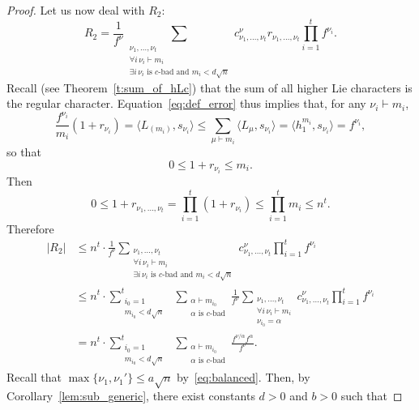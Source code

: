 \documentclass[12pt]%
{amsart}
\newcommand{\al}{{\alpha}}
\theoremstyle{plain}
\theoremstyle{definition}
\theoremstyle{remark}
\begin{document}
\begin{proof}
Let us now deal with $R_2$:
\[
    R_2 
    = \frac{1}{f^\nu} \sum_{\substack{\nu_1,\ldots,\nu_t \\ \forall i\, \nu_i \vdash m_i \\
    \exists i\, \nu_i \text{ is $c$-bad and } m_i < d \sqrt n}} c^\nu_{\nu_1,\ldots,\nu_t} r_{\nu_1, \dots, \nu_t} \prod_{i=1}^t f^{\nu_i} .
\]
Recall (see Theorem~\ref{t:sum_of_hLc})
that the sum of all higher Lie characters is the regular character.
Equation~\eqref{eq:def_error} thus implies that, for any $\nu_i \vdash m_i$, 
 \[
    \frac{f^{\nu_i}}{m_i} (1+r_{\nu_i}) 
    = \langle L_{(m_i)}, s_{\nu_i} \rangle 
    \le \sum_{\mu \vdash m_i} \langle L_\mu, s_{\nu_i} \rangle
    = \langle h_1^{m_i}, s_{\nu_i} \rangle
    = f^{\nu_i},
\]
so that
\[
    0 \le 1 + r_{\nu_i} \le m_i .
\]
Then
\[
    0
    \le 1+ r_{\nu_1, \ldots, \nu_t} 
    = \prod_{i=1}^{t} \left( 1+r_{\nu_i} \right)
    \le \prod_{i=1}^{t} m_i
    \le n^{t}.
\]
Therefore
\begin{align*}
    |R_2| 
    &\le %
    n^{t} \cdot
    \frac{1}{f^\nu} \sum_{\substack{\nu_1,\ldots,\nu_t \\ \forall i\, \nu_i \vdash m_i \\
    \exists i\, \nu_i \text{ is $c$-bad and } m_i < d \sqrt n}} c^\nu_{\nu_1,\ldots,\nu_t} \prod_{i=1}^t f^{\nu_i} \\
    &\le n^{t} \cdot
    \sum_{\substack{i_0 = 1 \\ m_{i_0} < d \sqrt n}}^{t} \,\,\sum_{\substack{\al \vdash m_{i_0} \\ \al \text{ is $c$-bad}}}
    \frac{1}{f^\nu} \sum_{\substack{\nu_1,\ldots,\nu_t \\ \forall i\, \nu_i \vdash m_i \\
    \nu_{i_0} = \al}} c^\nu_{\nu_1,\ldots,\nu_t} \prod_{i=1}^t f^{\nu_i} \\
    &= n^{t} \cdot
    \sum_{\substack{i_0 = 1 \\ m_{i_0} < d \sqrt n}}^{t} \,\,\sum_{\substack{\al \vdash m_{i_0} \\ \al \text{ is $c$-bad}}}
    \frac{f^{\nu/\al} f^\al}{f^\nu} .
\end{align*}
Recall that $\max\{\nu_1,\nu_1'\}\le a\sqrt n$ by~\eqref{eq:balanced}. Then,
by Corollary~\ref{lem:sub_generic},      
there exist constants $d > 0$ and $b > 0$ such that

\end{proof}
\end{document}
